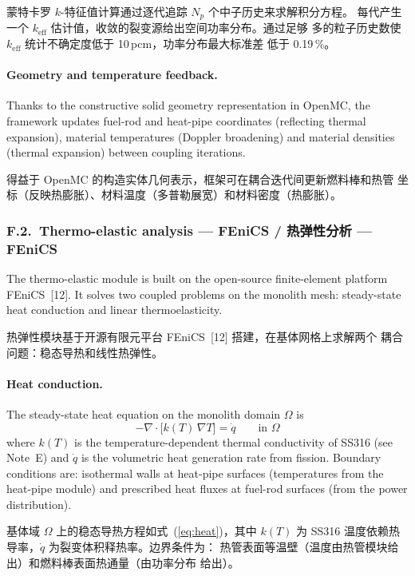 \documentclass[11pt,a4paper]{article}
\newcommand{\keff}{\ensuremath{k_{\mathrm{eff}}}}
\begin{document}
蒙特卡罗 $k$-特征值计算通过逐代追踪 $N_p$ 个中子历史来求解积分方程。
每代产生一个 \keff{} 估计值，收敛的裂变源给出空间功率分布。通过足够
多的粒子历史数使 \keff{} 统计不确定度低于 10\,pcm，功率分布最大标准差
低于 0.19\,\%。

\paragraph{Geometry and temperature feedback.}
Thanks to the constructive solid geometry representation in OpenMC, the
framework updates fuel-rod and heat-pipe coordinates (reflecting
thermal expansion), material temperatures (Doppler broadening) and
material densities (thermal expansion) between coupling iterations.

得益于 OpenMC 的构造实体几何表示，框架可在耦合迭代间更新燃料棒和热管
坐标（反映热膨胀）、材料温度（多普勒展宽）和材料密度（热膨胀）。


\subsubsection*{F.2.~Thermo-elastic analysis --- FEniCS /
热弹性分析 --- FEniCS}

The thermo-elastic module is built on the open-source finite-element
platform FEniCS~[12]. It solves two coupled problems on the monolith
mesh: steady-state heat conduction and linear thermoelasticity.

热弹性模块基于开源有限元平台 FEniCS~[12] 搭建，在基体网格上求解两个
耦合问题：稳态导热和线性热弹性。

\paragraph{Heat conduction.}
The steady-state heat equation on the monolith domain $\Omega$ is
\begin{equation}
-\nabla\cdot\bigl[k(T)\,\nabla T\bigr] = \dot{q}
\qquad \text{in } \Omega
\label{eq:heat}
\end{equation}
where $k(T)$ is the temperature-dependent thermal conductivity of
SS316 (see Note~E) and $\dot{q}$ is the volumetric heat generation
rate from fission. Boundary conditions are: isothermal walls at heat-pipe
surfaces (temperatures from the heat-pipe module) and prescribed heat
fluxes at fuel-rod surfaces (from the power distribution).

基体域 $\Omega$ 上的稳态导热方程如式~(\ref{eq:heat})，其中 $k(T)$
为 SS316 温度依赖热导率，$\dot{q}$ 为裂变体积释热率。边界条件为：
热管表面等温壁（温度由热管模块给出）和燃料棒表面热通量（由功率分布
给出）。
\end{document}
